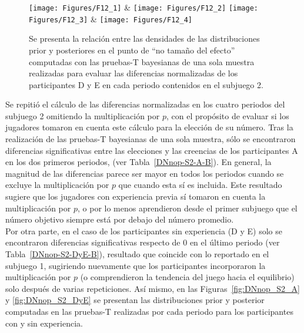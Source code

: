 \begin{figure}[hp]
\centering
\texttt{[image: Figures/F12\_1]} & \texttt{[image: Figures/F12\_2]} 
\texttt{[image: Figures/F12\_3]} & \texttt{[image: Figures/F12\_4]} 
\decoRule
\caption[Evaluación de las Diferencias Relativas entre creencias y elecciones en el Subjuego 1 sin la multiplicación por p (Factor de Bayes)]{Se presenta la relación entre las densidades de las distribuciones prior y posteriores en el punto de “no tamaño del efecto” computadas con las pruebas-T bayesianas de una sola muestra realizadas para evaluar las diferencias normalizadas de los participantes D y E en cada periodo contenidos en el subjuego 2.}
\label{fig:DN_S2_DyE}
\end{figure}  


Se repitió el cálculo de las diferencias normalizadas en los cuatro periodos del subjuego 2 omitiendo la multiplicación por $p$, con el propósito de evaluar si los jugadores tomaron en cuenta este cálculo para la elección de su número. Tras la realización de las pruebas-T bayesianas de una sola muestra,  sólo se encontraron diferencias significativas entre las elecciones y las creencias de los participantes A en los dos primeros  periodos, (ver Tabla~\ref{DNnop-S2-A-B}). En general, la magnitud de las diferencias parece ser mayor en todos los periodos cuando se excluye la multiplicación por $p$ que cuando esta sí es incluida. Este resultado sugiere que los jugadores con experiencia previa sí tomaron en cuenta la multiplicación por $p$, o por lo menos aprendieron desde el primer subjuego que el número objetivo siempre está por debajo del número promedio.\\

Por otra parte, en el caso de los participantes sin experiencia (D y E) solo se encontraron diferencias significativas respecto de 0 en el último periodo (ver Tabla~\ref{DNnop-S2-DyE-B}), resultado que coincide con lo reportado en el subjuego 1, sugiriendo nuevamente que los participantes incorporaron la multiplicación por $p$ (o comprendieron la tendencia del juego hacia el equilibrio)  solo después de varias repeticiones. Así mismo, en las Figuras~\ref{fig:DNnop_S2_A} y \ref{fig:DNnop_S2_DyE} se presentan las distribuciones prior y posterior computadas en las pruebas-T realizadas por cada periodo para los participantes con y sin experiencia.\\

